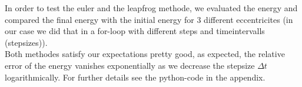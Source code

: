 \documentclass[12pt,a4paper,twoside]{article}
\begin{document}
\newline
\newline
In order to test the euler and the leapfrog methode, we evaluated the energy and compared the final energy with the initial energy for 3 different eccentricites (in our case we did that in a for-loop with different steps and timeintervalls (stepsizes)). \\
Both methodes satisfy our expectations pretty good, as expected, the relative error of the energy vanishes exponentially as we decrease the stepsize $\Delta t$ logarithmically. 
For further details see the python-code in the appendix.
\end{document}
